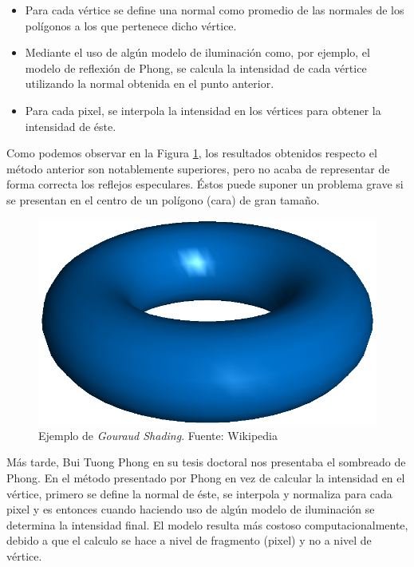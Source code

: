 \documentclass[titlepage,12pt]{article}
\begin{document}
\begin{itemize}
	\item Para cada vértice se define una normal como promedio de las normales de los polígonos a los que pertenece dicho vértice.
	\item Mediante el uso de algún modelo de iluminación como, por ejemplo, el modelo de reflexión de Phong, se calcula la intensidad de cada vértice utilizando la normal obtenida en el punto anterior.
	\item Para cada pixel, se interpola la intensidad en los vértices para obtener la intensidad de éste.
\end{itemize} 

Como podemos observar en la Figura \ref{Gouraud:shading}, los resultados obtenidos respecto el método anterior son notablemente superiores, pero no acaba de representar de forma correcta los reflejos especulares. Éstos puede suponer un problema grave si se presentan en el centro de un polígono (cara) de gran tamaño.

\begin{figure}[ht]
	\centering
	\includegraphics[scale=0.25]{media/Gouraudshading00.png}
	\caption{Ejemplo de \textit{Gouraud Shading}. Fuente: Wikipedia}
	\label{Gouraud:shading}
\end{figure}

Más tarde, Bui Tuong Phong en su tesis doctoral \citep{Phong1975} nos presentaba el sombreado de Phong. En el método presentado por Phong en vez de calcular la intensidad en el vértice, primero se define la normal de éste, se interpola y normaliza para cada pixel y es entonces cuando haciendo uso de algún modelo de iluminación se determina la intensidad final. El modelo resulta más costoso computacionalmente, debido a que el calculo se hace a nivel de fragmento (pixel) y no a nivel de vértice.
\end{document}
